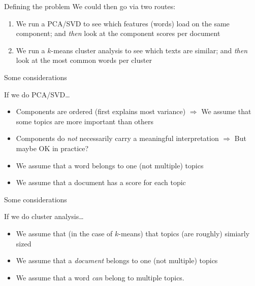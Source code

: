 \begin{frame}{Defining the problem}
  We could then go via two routes:
  \begin{enumerate}[<+->]
    \item We run a PCA/SVD to see which features (words) load on the same component; and \emph{then} look at the component scores per document
    \item We run a $k$-means cluster analysis to see which texts are similar; and \emph{then} look at the most common words per cluster
  \end{enumerate}
\end{frame}

\begin{frame}{Some considerations}
  \begin{block}{If we do PCA/SVD\ldots}
  \begin{itemize}
  \item Components are ordered (first explains most variance) $\Rightarrow$ We assume that some topics are more important than others
  \item Components do \emph{not} necessarily carry a meaningful interpretation $\Rightarrow$ But maybe OK in practice?
  \item We assume that a word belongs to one (not multiple) topics
  \item We assume that a document has a score for each topic
\end{itemize}
  \end{block}
\end{frame}


\begin{frame}{Some considerations}
  \begin{block}{If we do cluster analysis\ldots}
  \begin{itemize}
  \item We assume that (in the case of $k$-means) that topics (are roughly) simiarly sized
  \item We assume that a \emph{document} belongs to one (not multiple) topics
  \item We assume that a word \emph{can} belong to multiple topics.
\end{itemize}
  \end{block}
\end{frame}



